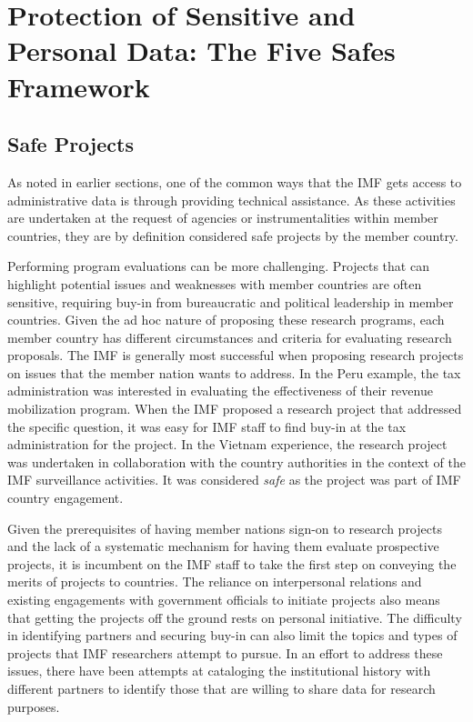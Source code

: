 \hypertarget{protection-of-sensitive-and-personal-data-the-five-safes-framework-7}{%
\section{Protection of Sensitive and Personal Data: The Five Safes Framework}\label{protection-of-sensitive-and-personal-data-the-five-safes-framework-7}}

\hypertarget{safe-projects-7}{%
\subsection{Safe Projects}\label{safe-projects-7}}

As noted in earlier sections, one of the common ways that the IMF gets access to administrative data is through providing technical assistance. As these activities are undertaken at the request of agencies or instrumentalities within member countries, they are by definition considered safe projects by the member country.

Performing program evaluations can be more challenging. Projects that can highlight potential issues and weaknesses with member countries are often sensitive, requiring buy-in from bureaucratic and political leadership in member countries. Given the ad hoc nature of proposing these research programs, each member country has different circumstances and criteria for evaluating research proposals. The IMF is generally most successful when proposing research projects on issues that the member nation wants to address. In the Peru example, the tax administration was interested in evaluating the effectiveness of their revenue mobilization program. When the IMF proposed a research project that addressed the specific question, it was easy for IMF staff to find buy-in at the tax administration for the project. In the Vietnam experience, the research project was undertaken in collaboration with the country authorities in the context of the IMF surveillance activities. It was considered \emph{safe} as the project was part of IMF country engagement.

Given the prerequisites of having member nations sign-on to research projects and the lack of a systematic mechanism for having them evaluate prospective projects, it is incumbent on the IMF staff to take the first step on conveying the merits of projects to countries. The reliance on interpersonal relations and existing engagements with government officials to initiate projects also means that getting the projects off the ground rests on personal initiative. The difficulty in identifying partners and securing buy-in can also limit the topics and types of projects that IMF researchers attempt to pursue. In an effort to address these issues, there have been attempts at cataloging the institutional history with different partners to identify those that are willing to share data for research purposes.

